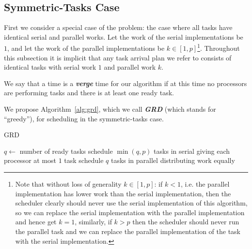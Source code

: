 \documentclass[twocolumn]{article}[10pt]
\newcommand{\defn}[1]{{\textit{\textbf{\boldmath #1}}}\xspace}
\newcommand{\floor}[1]{\left\lfloor #1 \right\rfloor}
\begin{document}
\subsection{Symmetric-Tasks Case}
\label{subsec:symmetrictasks}
First we consider a special case of the problem: the case where
all tasks have identical serial and parallel works. Let
the work of the serial implementations be $1$, and let the work
of the parallel implementations be $k \in [1, p]$\footnote{Note that
without loss of generality $k \in [1,p]$: if $k < 1$, i.e. the
parallel implementation has lower work than the serial
implementation, then the scheduler clearly should never use the serial
implementation of this algorithm, so we can replace the serial
implementation with the parallel implementation and hence get
$k=1$, similarly, if $k > p$ then the scheduler should never run
the parallel task and we can replace the parallel implementation
of the task with the serial implementation.}. Throughout this
subsection it is implicit that any task arrival plan we
refer to consists of identical tasks with serial work $1$ and parallel work $k$.

We say that a time is a \defn{verge} time for our algorithm if at
this time no processors are performing tasks and there is at
least one ready task.

We propose Algorithm~\ref{alg:grd}, which we call \defn{GRD}
(which stands for \enquote{greedy}),
for scheduling in the symmetric-tasks case.

\begin{algorithm}
  \caption{GRD}
  \label{alg:grd}
  \begin{algorithmic}
        \State $q \gets $ number of ready tasks
          \State schedule $\min(q, p)$ tasks in serial
          \State giving each processor at most $1$ task
        \Else
          \State schedule $q$ tasks in parallel
          \State distributing work equally 
        \EndIf
      \EndIf
    \EndWhile
  \end{algorithmic}
\end{algorithm}

\end{document}
